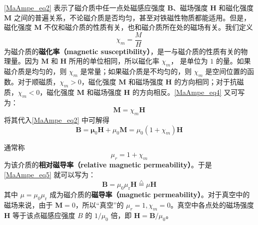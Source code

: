 \autoref{MaAmpe_eq2} 表示了磁介质中任一点处磁感应强度 $\mathbf B$、磁场强度 $\mathbf H$ 和磁化强度 $\mathbf M $ 之间的普遍关系，不论磁介质是否均匀，甚至对铁磁性物质都能适用。但是，磁化强度 $\mathbf M $ 不仅和磁介质的性质有关，也和磁介质所在处的磁场有关。我们定义
\begin{equation} \label{MaAmpe_eq4}
\chi_{m}=\frac{M}{H}
\end{equation}
为磁介质的\textbf{磁化率（magnetic susceptibility）}，是一与磁介质的性质有关的物理量。因为 $\mathbf M $ 和 $\mathbf H $ 所用的单位相同，所以磁化率 $\chi_m$， 是单位为 $1 $ 的量。如果磁介质是均匀的，则 $\chi_m$ 是常量；如果磁介质是不均匀的，则 $\chi_m$ 是空间位置的函数。对于顺磁质，$\chi_m>0$，磁化强度 $\mathbf M $ 和磁场强度 $\mathbf H $ 的方向相同；对于抗磁质，$\chi_m<0$，磁化强度 $\mathbf M $ 和磁场强度 $\mathbf H $ 的方向相反。\autoref{MaAmpe_eq4} 又可写为：
\begin{equation} \label{MaAmpe_eq5}
\mathbf M = \chi_m\mathbf H
\end{equation}
将其代入\autoref{MaAmpe_eq2} 中可解得
\begin{equation}
\mathbf{B}=\mathbf{\mu}_{0} \mathbf{H}+\mu_{0} \mathbf{M}=\mu_{0}\left(1+\chi_{{m}}\right) \mathbf{H}
\end{equation}

通常称
\begin{equation}
\mu_{{r}}=1+\chi_{m}
\end{equation}
为该介质的\textbf{相对磁导率（relative magnetic permeability）}。于是\autoref{MaAmpe_eq5} 就可以写为：
\begin{equation}
\mathbf B=\mu_{0} \mu_{\mathrm{r}} \mathbf H\overset{\triangle}=\mu \mathbf H
\end{equation}
其中 $\mu = \mu_{0} \mu_{\mathrm{r}} $ 成为磁介质的\textbf{磁导率（magnetic permeability）}。对于真空中的磁场来说，由于 $\mathbf M=0$，所以“真空”的 $\mu_r=1,\chi_m=0$。真空中各点处的磁场强度 $\mathbf H $ 等于该点磁感应强度 $B $ 的 $1/\mu_0$ 倍，即 $\mathbf H = \mathbf B / \mu_0$。